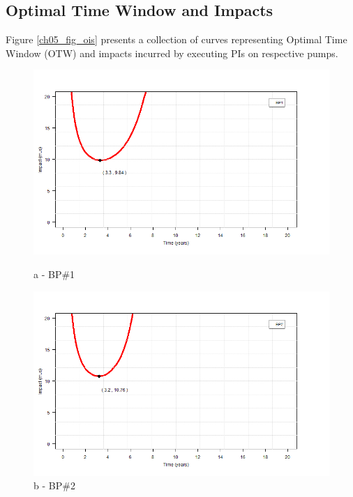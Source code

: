 \subsection{Optimal Time Window and Impacts}
Figure \ref{ch05_fig_ois} presents a collection of curves representing Optimal Time Window (OTW) and impacts incurred by executing PIs on respective pumps.
\begin{figure}[!htb]
	\begin{minipage}[b]{0.5\linewidth}
		\centering
		\includegraphics[width=\textwidth]{figures/ch05_fig_ois_pump1}
		\caption*{a - BP\#1}
	\end{minipage}
	\hspace{0.05cm}
	\begin{minipage}[b]{0.5\linewidth}
		\centering
		\includegraphics[width=\textwidth]{figures/ch05_fig_ois_pump2}
		\caption*{b - BP\#2}
	\end{minipage}
	\hspace{0.05cm}
\begin{minipage}[b]{0.5\linewidth}

\end{minipage}
\end{figure}

